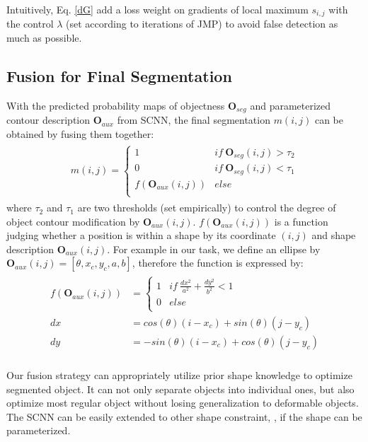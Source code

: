 Intuitively, Eq. \ref{dG} add a loss weight on gradients of  local maximum $s_{i,j}$ with the control $\lambda$ (set according to iterations of JMP) to avoid false detection as much as possible.



\subsection{Fusion for Final Segmentation}
With the predicted probability maps of objectness $\mathbf{O}_{seg}$ and parameterized contour description $\mathbf{O}_{aux}$ from SCNN, the final segmentation $m(i,j)$ can be obtained by fusing them together:
%
\begin{eqnarray}\label{fusion}
\begin{aligned}
m(i,j)=\left\{\begin{array}{cc}
1&if~\mathbf{O}_{seg}(i,j)>\tau_2\\
0&if~\mathbf{O}_{seg}(i,j)<\tau_1\\
f(\mathbf{O}_{aux}(i,j))&else\\
\end{array}\right.
\end{aligned}
\end{eqnarray}
%
where $\tau_2$ and $\tau_1$ are two thresholds (set empirically) to control the degree of object contour modification by $\mathbf{O}_{aux}(i,j)$.
%
$f(\mathbf{O}_{aux}(i,j))$ is a function judging whether a position is within a shape by its coordinate $(i,j)$ and shape description $\mathbf{O}_{aux}(i,j)$.
For example in our task, we define an ellipse by $\mathbf{O}_{aux}(i,j) = [\theta, x_c, y_c, a, b]$, therefore the function is expressed by:
\begin{eqnarray}\label{fusion}
\begin{aligned}
f(\mathbf{O}_{aux}(i,j))&=\left\{\begin{array}{cc}
1&if~\frac{dx^2}{a^2}+\frac{dy^2}{b^2}<1\\
0&else\\
\end{array}\right.\\
dx &= cos(\theta)(i-x_c)+sin(\theta)(j-y_c)\\
dy &= -sin(\theta)(i-x_c)+cos(\theta)(j-y_c)\\
\end{aligned}
\end{eqnarray}

Our fusion strategy can appropriately utilize prior shape knowledge to optimize segmented object.
It can not only separate objects into individual ones, but also optimize most regular object without losing generalization to deformable objects.
The SCNN can be easily extended to other shape constraint, , if the shape can be parameterized.
